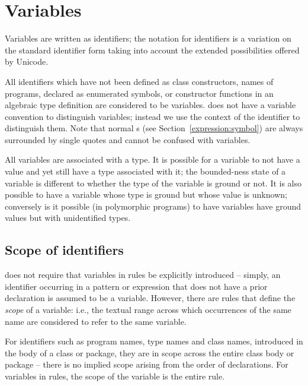 \section{Variables}
\label{expression:variable}

Variables are written as identifiers; the notation for identifiers is a variation on the standard identifier form taking into account the extended possibilities offered by Unicode.

All identifiers which have not been defined as class constructors, names of programs, declared as enumerated symbols, or constructor functions in an algebraic type definition are considered to be variables. \go does not have a variable convention to distinguish variables; instead we use the context of the identifier to distinguish them. Note that normal s (see Section~\vref{expression:symbol}) are always surrounded by single quotes and cannot be confused with variables.

All variables are associated with a type. It is possible for a variable to not have a value and yet still have a type associated with it; the bounded-ness state of a variable is different to whether the type of the variable is ground or not. It is also possible to have a variable whose type is ground but whose value is unknown; conversely is it possible (in polymorphic programs) to have variables have ground values but with unidentified types.

\subsection{Scope of identifiers}
\label{variable:scope}

\go does not require that variables in rules be explicitly introduced -- simply, an identifier occurring in a pattern or expression that does not have a prior declaration is assumed to be a variable. However, there are rules that define the \emph{scope} of a variable: i.e., the textual range across which occurrences of the same name are considered to refer to the same variable.

For identifiers such as program names, type names and class names, introduced in the body of a class or package, they are in scope across the entire class body or package -- there is no implied scope arising from the order of declarations. For variables in rules, the scope of the variable is the entire rule.

